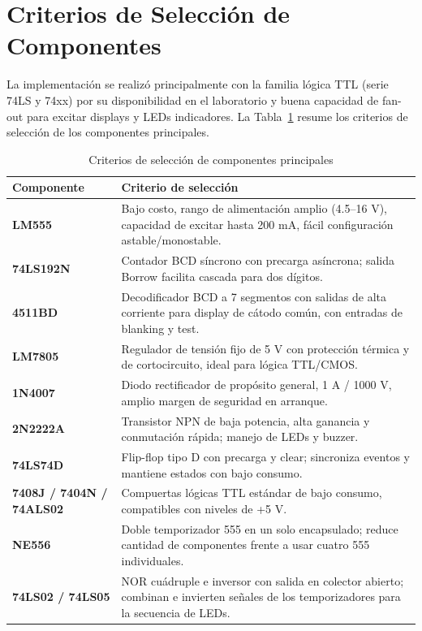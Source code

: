 \documentclass[10pt,onecolumn]{IEEEtran}
\begin{document}

\section{Criterios de Selección de Componentes}

La implementación se realizó principalmente con la familia lógica TTL (serie 74LS y 74xx) por su disponibilidad en el laboratorio y buena capacidad de fan-out para excitar displays y LEDs indicadores. La Tabla~\ref{tab:componentes} resume los criterios de selección de los componentes principales.

\begin{table}[H]
\centering
\caption{Criterios de selección de componentes principales}
\label{tab:componentes}
\begin{tabular}{>{\bfseries}p{2.5cm} p{5.5cm}}
\toprule
Componente & Criterio de selección \\
\midrule
LM555 & Bajo costo, rango de alimentación amplio (4.5--16 V), capacidad de excitar hasta 200 mA, fácil configuración astable/monostable. \\
74LS192N & Contador BCD síncrono con precarga asíncrona; salida Borrow facilita cascada para dos dígitos. \\
4511BD & Decodificador BCD a 7 segmentos con salidas de alta corriente para display de cátodo común, con entradas de blanking y test. \\
LM7805 & Regulador de tensión fijo de 5 V con protección térmica y de cortocircuito, ideal para lógica TTL/CMOS. \\
1N4007 & Diodo rectificador de propósito general, 1 A / 1000 V, amplio margen de seguridad en arranque. \\
2N2222A & Transistor NPN de baja potencia, alta ganancia y conmutación rápida; manejo de LEDs y buzzer. \\
74LS74D & Flip-flop tipo D con precarga y clear; sincroniza eventos y mantiene estados con bajo consumo. \\
7408J / 7404N / 74ALS02 & Compuertas lógicas TTL estándar de bajo consumo, compatibles con niveles de +5 V. \\
NE556 & Doble temporizador 555 en un solo encapsulado; reduce cantidad de componentes frente a usar cuatro 555 individuales. \\
74LS02 / 74LS05 & NOR cuádruple e inversor con salida en colector abierto; combinan e invierten señales de los temporizadores para la secuencia de LEDs. \\
\bottomrule
\end{tabular}
\end{table}
\end{document}
